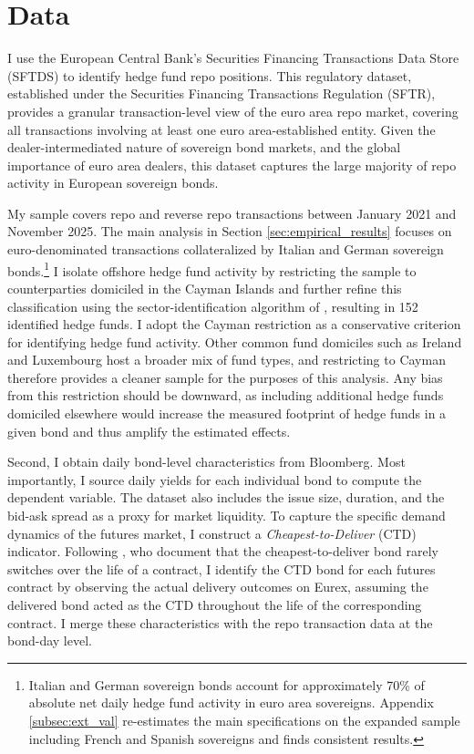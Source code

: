 \documentclass[english, 11pt, oneside]{article}
\begin{document}
\section{Data}
\label{sec:data}

I use the European Central Bank’s Securities Financing Transactions Data Store (SFTDS) to identify hedge fund repo positions. This regulatory dataset, established under the Securities Financing Transactions Regulation (SFTR), provides a granular transaction-level view of the euro area repo market, covering all transactions involving at least one euro area-established entity. Given the dealer-intermediated nature of sovereign bond markets, and the global importance of euro area dealers, this dataset captures the large majority of repo activity in European sovereign bonds.

My sample covers repo and reverse repo transactions between January 2021 and November 2025. The main analysis in Section \ref{sec:empirical_results} focuses on euro-denominated transactions collateralized by Italian and German sovereign bonds.\footnote{Italian and German sovereign bonds account for approximately 70\% of absolute net daily hedge fund activity in euro area sovereigns. Appendix \ref{subsec:ext_val} re-estimates the main specifications on the expanded sample including French and Spanish sovereigns and finds consistent results.} I isolate offshore hedge fund activity by restricting the sample to counterparties domiciled in the Cayman Islands \citep[see][for a discussion on the relevance of Cayman Island domiciled hedge funds]{barth2025cross} and further refine this classification using the sector-identification algorithm of \citet{lenoci2021}, resulting in 152 identified hedge funds. I adopt the Cayman restriction as a conservative criterion for identifying hedge fund activity. Other common fund domiciles such as Ireland and Luxembourg host a broader mix of fund types, and restricting to Cayman therefore provides a cleaner sample for the purposes of this analysis. Any bias from this restriction should be downward, as including additional hedge funds domiciled elsewhere would increase the measured footprint of hedge funds in a given bond and thus amplify the estimated effects.

Second, I obtain daily bond-level characteristics from Bloomberg. Most importantly, I source daily yields for each individual bond to compute the dependent variable. The dataset also includes the issue size, duration, and the bid-ask spread as a proxy for market liquidity. To capture the specific demand dynamics of the futures market, I construct a \textit{Cheapest-to-Deliver} (CTD) indicator. Following \citet{pelizzon2025}, who document that the cheapest-to-deliver bond rarely switches over the life of a contract, I identify the CTD bond for each futures contract by observing the actual delivery outcomes on Eurex, assuming the delivered bond acted as the CTD throughout the life of the corresponding contract. I merge these characteristics with the repo transaction data at the bond-day level.
\end{document}
